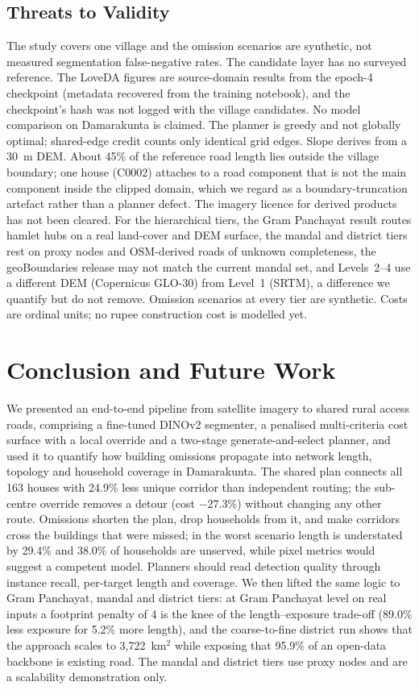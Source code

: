 \documentclass[journal]{IEEEtran}
\begin{document}
\subsection{Threats to Validity}
The study covers one village and the omission scenarios are synthetic, not measured segmentation false-negative rates. The candidate layer has no surveyed reference. The LoveDA figures are source-domain results from the epoch-4 checkpoint (metadata recovered from the training notebook), and the checkpoint's hash was not logged with the village candidates. No model comparison on Damarakunta is claimed. The planner is greedy and not globally optimal; shared-edge credit counts only identical grid edges. Slope derives from a 30~m DEM. About 45\% of the reference road length lies outside the village boundary; one house (C0002) attaches to a road component that is not the main component inside the clipped domain, which we regard as a boundary-truncation artefact rather than a planner defect. The imagery licence for derived products has not been cleared. For the hierarchical tiers, the Gram Panchayat result routes hamlet hubs on a real land-cover and DEM surface, the mandal and district tiers rest on proxy nodes and OSM-derived roads of unknown completeness, the geoBoundaries release may not match the current mandal set, and Levels~2--4 use a different DEM (Copernicus GLO-30) from Level~1 (SRTM), a difference we quantify but do not remove. Omission scenarios at every tier are synthetic. Costs are ordinal units; no rupee construction cost is modelled yet.

\section{Conclusion and Future Work}\label{sec:conclusion}
We presented an end-to-end pipeline from satellite imagery to shared rural access roads, comprising a fine-tuned DINOv2 segmenter, a penalised multi-criteria cost surface with a local override and a two-stage generate-and-select planner, and used it to quantify how building omissions propagate into network length, topology and household coverage in Damarakunta. The shared plan connects all 163 houses with 24.9\% less unique corridor than independent routing; the sub-centre override removes a detour (cost $-27.3$\%) without changing any other route. Omissions shorten the plan, drop households from it, and make corridors cross the buildings that were missed; in the worst scenario length is understated by 29.4\% and 38.0\% of households are unserved, while pixel metrics would suggest a competent model. Planners should read detection quality through instance recall, per-target length and coverage. We then lifted the same logic to Gram Panchayat, mandal and district tiers: at Gram Panchayat level on real inputs a footprint penalty of 4 is the knee of the length--exposure trade-off (89.0\% less exposure for 5.2\% more length), and the coarse-to-fine district run shows that the approach scales to 3{,}722~km$^2$ while exposing that 95.9\% of an open-data backbone is existing road. The mandal and district tiers use proxy nodes and are a scalability demonstration only.
\end{document}
